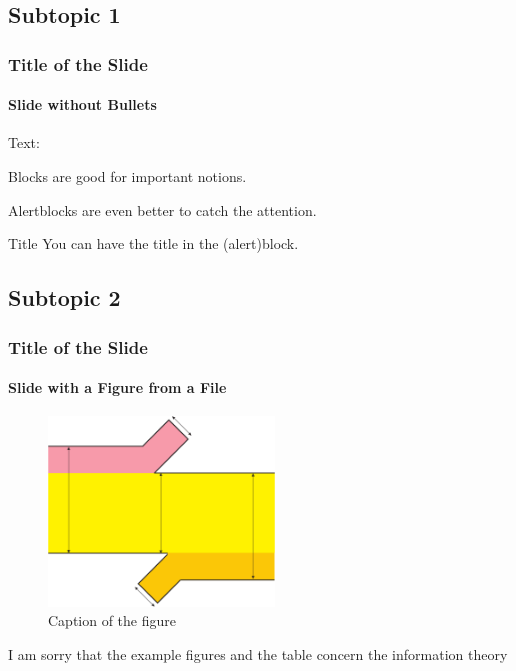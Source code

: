 
\subsection{Subtopic 1} %

\begin{frame}
	\frametitle{Title of the Slide}
		\framesubtitle{Slide without Bullets}

	Text:

	\vfill

	\begin{block}{}
		Blocks are good for important notions.
	\end{block}

	\vfill

	\begin{alertblock}{}
		Alertblocks are even better to catch the attention.
	\end{alertblock}

	\vfill

	\begin{alertblock}{Title}
		You can have the title in the (alert)block.
	\end{alertblock}

\end{frame}

\subsection{Subtopic 2} %

\begin{frame}
	\frametitle{Title of the Slide}
		\framesubtitle{Slide with a Figure from a File}

	\begin{figure}
		\includegraphics[width=6cm]{./figures/TIiK_channel_mutual_new}
		\caption{Caption of the figure}
	\end{figure}

	\vspace{-0.5cm}

	\tiny I am sorry that the example figures and the table concern the information theory \smiley

\end{frame}

